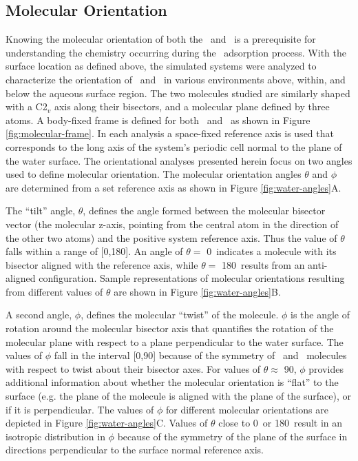 \documentclass{article}
\begin{document}
\subsection{Molecular Orientation}

Knowing the molecular orientation of both the \wat~and \suldiox~is a prerequisite for understanding the chemistry occurring during the \suldiox~adsorption process. With the surface location as defined above, the simulated systems were analyzed to characterize the orientation of \wat~and \suldiox~in various environments above, within, and below the aqueous surface region. The two molecules studied are similarly shaped with a C2$_v$ axis along their bisectors, and a molecular plane defined by three atoms. A body-fixed frame is defined for both \wat~and \suldiox~as shown in Figure \ref{fig:molecular-frame}. In each analysis a space-fixed reference axis is used that corresponds to the long axis of the system's periodic cell normal to the plane of the water surface. The orientational analyses presented herein focus on two angles used to define molecular orientation. The molecular orientation angles $\theta$ and $\phi$ are determined from a set reference axis as shown in Figure \ref{fig:water-angles}A.
	
	The ``tilt'' angle, $\theta$, defines the angle formed between the molecular bisector vector (the molecular z-axis, pointing from the central atom in the direction of the other two atoms) and the positive system reference axis. Thus the value of $\theta$ falls within a range of [0\textdegree,180\textdegree]. An angle of $\theta=$ 0\textdegree~indicates a molecule with its bisector aligned with the reference axis, while $\theta=$ 180\textdegree~results from an anti-aligned configuration. Sample representations of molecular orientations resulting from different values of $\theta$ are shown in Figure \ref{fig:water-angles}B.
	
	A second angle, $\phi$, defines the molecular ``twist'' of the molecule. $\phi$ is the angle of rotation around the molecular bisector axis that quantifies the rotation of the molecular plane with respect to a plane perpendicular to the water surface. The values of $\phi$ fall in the interval [0\textdegree,90\textdegree] because of the symmetry of \wat~and \suldiox~molecules with respect to twist about their bisector axes. For values of $\theta \approx$ 90\textdegree, $\phi$ provides additional information about whether the molecular orientation is ``flat'' to the surface (e.g. the plane of the molecule is aligned with the plane of the surface), or if it is perpendicular. The values of $\phi$ for different molecular orientations are depicted in Figure \ref{fig:water-angles}C. %
	Values of $\theta$ close to 0\textdegree~or 180\textdegree~result in an isotropic distribution in $\phi$ because of the symmetry of the plane of the surface in directions perpendicular to the surface normal reference axis.
\end{document}
